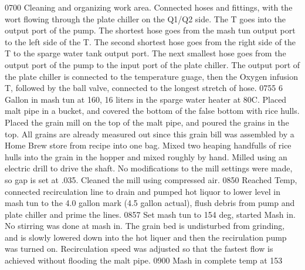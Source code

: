 \def\todaysdate{20210717}
\newday{\todaysdate}\label{\todaysdate}


0700 Cleaning and organizing work area.  Connected hoses and fittings, with the wort flowing through the plate chiller on the Q1/Q2 side.  The T goes into the output port of the pump.  The shortest hose goes from the mash tun output port to the left side of the T.  The second shortest hose goes from the right side of the T to the sparge water tank output port.  The next smallest hose goes from the output port of the pump to the input port of the plate chiller.  The output port of the plate chiller is connected to the temperature guage, then the Oxygen infusion T, followed by the ball valve, connected to the longest stretch of hose.
0755 6 Gallon in mash tun at 160, 16 liters in the sparge water heater at 80C.  Placed malt pipe in a bucket, and covered the bottom of the false bottom with rice hulls.  Placed the grain mill on the top of the malt pipe, and poured the grains in the top.  All grains are already measured out since this grain bill was assembled by a Home Brew store from recipe into one bag.  Mixed two heaping handfulls of rice hulls into the grain in the hopper and mixed roughly by hand.  Milled using an electric drill to drive the shaft.  No modifications to the mill settings were made, so gap is set at .035.  Cleaned the mill using compressed air.
0850 Reached Temp, connected recirculation line to drain and pumped hot liquor to lower level in mash tun to the 4.0 gallon mark (4.5 gallon actual), flush debris from pump and plate chiller and prime the lines.
0857 Set mash tun to 154 deg, started Mash in. No stirring was done at mash in.  The grain bed is undisturbed from grinding, and is slowly lowered down into the hot liquer and then the recirulation pump was turned on.  Recirculation speed was adjusted so that the fastest flow is achieved without flooding the malt pipe.
0900 Mash in complete temp at 153
